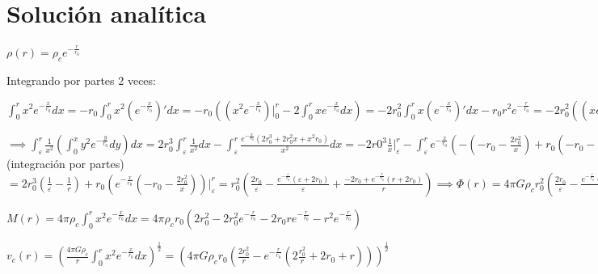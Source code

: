 \documentclass[12pt]{book}
\begin{document}
\section*{Solución analítica}
\begin{description}

\item  $\rho(r) =  \rho_c  e^{-\frac{r}{r_0}} $  
\item Integrando por partes 2 veces:
\item $\int_0^r{x^2 e^{-\frac{x}{r_0}}dx} = - r_0 \int_0^r{x^2 (e^{-\frac{x}{r_0}})\prime dx}
=-r_0( (x^2 e^{-\frac{x}{r_0}})\Big|_0^r  - 2\int_0^r{x e^{-\frac{x}{r_0}}dx})  = 
-2 r_0^2 \int_0^r{x (e^{-\frac{x}{r_0}})\prime dx} - r_0 r^2 e^{-\frac{r}{r_0}} = -2 r_0^2 ((x e^{-\frac{x}{r_0}})\Big|_0^r - \int_0^r{e^{-\frac{x}{r_0}}dx}) - r_0 r^2 e^{-\frac{r}{r_0}} = 
-2 r_0^3 e^{-\frac{x}{r_0}}\Big|_0^r -2 r_0^2 r e^{-\frac{r}{r_0}} - r_0 r^2 e^{-\frac{r}{r_0}} = 
2 r_0^3 -2 r_0^3 e^{-\frac{r}{r_0}} -2 r_0^2 r e^{-\frac{r}{r_0}} - r_0 r^2 e^{-\frac{r}{r_0}}  
= 2  r_0^3 -  r_0 e^{-\frac{r}{r_0}} (2 r_0^2  + 2 r_0 r + r^2)
$

\item $\implies \int_\varepsilon^r{ \frac{1}{x^2}(\int_0^x{y^2 e^{-\frac{y}{r_0}}dy})dx} = 
2 r_0^3 \int_\varepsilon^r{\frac{1}{x^2}dx} - \int_\varepsilon^r{\frac{ e^{-\frac{x}{r_0}} (2 r_0^3 + 2 r_0^2 x +x^2 r_0)}{x^2}dx }=
-2 r0^3 \frac{1}{x}\Big|_\varepsilon^r -  \int_\varepsilon^r{e^{-\frac{x}{r_0}} (- (-r_0 - \frac{2 r_0^2}{x}) + r_0 (-r_0 - \frac{2 r_0^2}{x})\prime) dx } = 
2 r_0^3 (\frac{1}{\varepsilon} - \frac{1}{r}) + r_0 ((e^{-\frac{x}{r_0}})\prime (-r_0 - \frac{2 r_0^2}{x})  + e^{-\frac{x}{r_0}} (-r_0 - \frac{2 r_0^2}{x})\prime )= $(integración por partes)$
=2 r_0^3 (\frac{1}{\varepsilon} - \frac{1}{r}) + r_0 (e^{-\frac{x}{r_0}} (-r_0 - \frac{2 r_0^2}{x})) \Big|_\varepsilon^r =
 r_0^2 (\frac{2 r_0}{\varepsilon} - \frac{e^{-\frac{\varepsilon}{r_0}}(\varepsilon + 2 r_0)  }{\varepsilon} + \frac{-2 r_0 + e^{-\frac{r}{r_0}} (r + 2 r_0) }{r} )
\implies \Phi(r) = 4 \pi G \rho_c r_0^2 (\frac{2 r_0}{\varepsilon} - \frac{e^{-\frac{\varepsilon}{r_0}}(\varepsilon + 2 r_0)  }{\varepsilon}
+ \frac{-2 r_0 + e^{-\frac{r}{r_0}} (r + 2 r_0) }{r} )$

\item $M(r) = 4 \pi \rho_c \int_0^r{x^2 e^{-\frac{x}{r_0}}dx} = 4 \pi \rho_c r_0 ( 2 r_0^2 - 2 r_0^2 e^{-\frac{r}{r_0}} - 2 r_0 r e^{-\frac{r}{r_0}} - r^2 e^{-\frac{r}{r_0}}) $

\item $v_c(r) = (\frac{4 \pi G \rho_c}{r}\int_0^r{x^2 e^{-\frac{x}{r_0}}dx} )^{\frac{1}{2}}   
= (4 \pi G \rho_c r_0 (\frac{2 r_0^2}{r} -  e^{-\frac{r}{r_0}} (2 \frac{r_0^2}{r} +  2 r_0 + r) ))^{\frac{1}{2}} $



\end{description}
\end{document}
